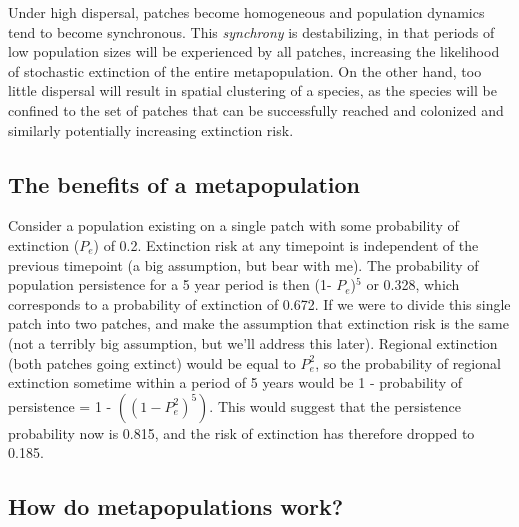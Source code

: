 \documentclass[12pt]{article}
\begin{document}
Under high dispersal, patches become homogeneous and population dynamics tend to become synchronous. This \textit{synchrony} is destabilizing, in that periods of low population sizes will be experienced by all patches, increasing the likelihood of stochastic extinction of the entire metapopulation. On the other hand, too little dispersal will result in spatial clustering of a species, as the species will be confined to the set of patches that can be successfully reached and colonized and similarly potentially increasing extinction risk.









\bigskip

\subsection*{The benefits of a metapopulation}

Consider a population existing on a single patch with some probability of extinction ($P_e$) of 0.2. Extinction risk at any timepoint is independent of the previous timepoint (a big assumption, but bear with me). The probability of population persistence for a 5 year period is then (1- $P_e$)$^{5}$ or 0.328, which corresponds to a probability of extinction of 0.672. If we were to divide this single patch into two patches, and make the assumption that extinction risk is the same (not a terribly big assumption, but we'll address this later). Regional extinction (both patches going extinct) would be equal to $P_{e}^{2}$, so the probability of regional extinction sometime within a period of 5 years would be  1 - probability of persistence = 1 - $\left((1 - P_e^{2})^{5}\right)$. This would suggest that the persistence probability now is 0.815, and the risk of extinction has therefore dropped to 0.185. 

















\bigskip


\subsection*{How do metapopulations work?}
\end{document}
